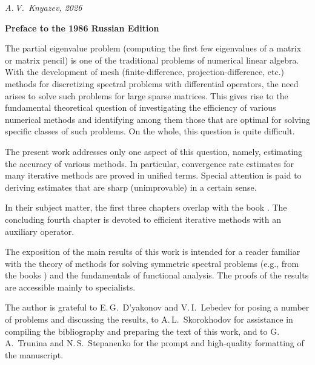 \documentclass[11pt,oneside]{book}
\newcommand{\monounnumchapter}[1]{%
  \clearpage
  \thispagestyle{plain}%
  \phantomsection
  \addcontentsline{toc}{chapter}{#1}%
  \markboth{#1}{#1}%
  \vspace*{6mm}%
  {\centering\LARGE\bfseries #1\par}%
  \vspace{6mm}%
}
\begin{document}
\noindent\textit{A.\,V.~Knyazev, 2026}

\vspace{8mm}
{}
{\centering\LARGE\bfseries Preface to the 1986 Russian Edition\par}
\vspace{5mm}

The partial eigenvalue problem (computing the first few eigenvalues of a matrix or matrix pencil) is one of the traditional problems of numerical linear algebra. With the development of mesh (finite-difference, projection-difference, etc.) methods for discretizing spectral problems with differential operators, the need arises to solve such problems for large sparse matrices. This gives rise to the fundamental theoretical question of investigating the efficiency of various numerical methods and identifying among them those that are optimal for solving specific classes of such problems. On the whole, this question is quite difficult.

The present work addresses only one aspect of this question, namely, estimating the accuracy of various methods. In particular, convergence rate estimates for many iterative methods are proved in unified terms. Special attention is paid to deriving estimates that are sharp (unimprovable) in a certain sense.

In their subject matter, the first three chapters overlap with the book \citep{Parlett1983}. The concluding fourth chapter is devoted to efficient iterative methods with an auxiliary operator.

The exposition of the main results of this work is intended for a reader familiar with the theory of methods for solving symmetric spectral problems (e.g., from the books \citep{FaddeevFaddeeva1963,Parlett1983}) and the fundamentals of functional analysis. The proofs of the results are accessible mainly to specialists.

The author is grateful to E.\,G.~D'yakonov and V.\,I.~Lebedev for posing a number of problems and discussing the results, to A.\,L.~Skorokhodov for assistance in compiling the bibliography and preparing the text of this work, and to G.\,A.~Trunina and N.\,S.~Stepanenko for the prompt and high-quality formatting of the manuscript. %
\end{document}
